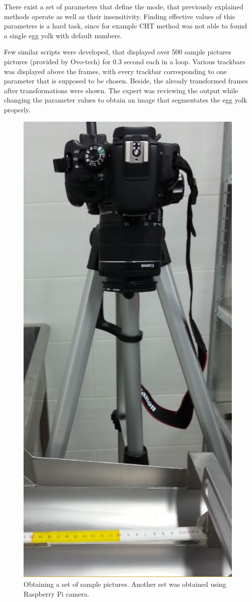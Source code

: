 \documentclass[12pt,twoside,a4paper]{article}
\begin{document}
There exist a set of parameters that define the mode, that previously explained methods operate as well as their insensitivity.
Finding effective values of this parameters is a hard task, since for example CHT method was not able to found a single egg yolk with default numbers.


Few similar scripts were developed, that displayed over 500 sample pictures pictures (provided by Ovo-tech) for 0.3 second each in a loop.
Various trackbars was displayed above the frames, with every trackbar corresponding to one parameter that is supposed to be chosen.
Beside, the already transformed frames after transformations were shown.
The expert was reviewing the output while changing the parameter values to obtain an image that segmentates the egg yolk properly.

\begin{figure}[H]
\centering
\includegraphics[width=0.2\paperwidth]{samples}
\caption{Obtaining a set of sample pictures. Another set was obtained using Raspberry Pi camera.}\label{fig:samples}
\end{figure}
\end{document}
